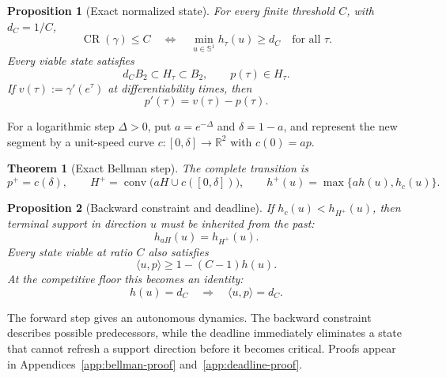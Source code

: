 \documentclass[10pt,a4paper]{article}
\newtheorem{theorem}{Theorem}[section]
\newtheorem{proposition}[proposition]{Proposition}
\theoremstyle{definition}
\theoremstyle{remark}
\DeclareMathOperator{\conv}{conv}
\DeclareMathOperator{\CR}{CR}
\newcommand{\R}{\mathbb{R}}
\newcommand{\Sph}{\mathbb{S}}
\newcommand{\ip}[2]{\langle #1,#2\rangle}
\begin{document}
\begin{proposition}[Exact normalized state]
\label{prop:normalized-state}
For every finite threshold $C$, with $d_C=1/C$,
\begin{equation}
\CR(\gamma)\le C
\quad\Longleftrightarrow\quad
\min_{u\in\Sph^1}h_\tau(u)\ge d_C
\quad\text{for all }\tau.
\label{eq:viability-state}
\end{equation}
Every viable state satisfies
\begin{equation}
d_CB_2\subset H_\tau\subset B_2,
\qquad
p(\tau)\in H_\tau.
\label{eq:state-inclusions}
\end{equation}
If $v(\tau):=\gamma'(e^\tau)$ at differentiability times, then
\begin{equation}
p'(\tau)=v(\tau)-p(\tau).
\label{eq:p-dynamics}
\end{equation}
\end{proposition}

For a logarithmic step $\Delta>0$, put $a=e^{-\Delta}$ and $\delta=1-a$, and represent the new segment by a unit-speed curve $c:[0,\delta]\to\R^2$ with $c(0)=ap$.

\begin{theorem}[Exact Bellman step]
\label{thm:bellman-step}
The complete transition is
\begin{equation}
p^+=c(\delta),
\qquad
H^+=\conv\bigl(aH\cup c([0,\delta])\bigr),
\qquad
h^+(u)=\max\{ah(u),h_c(u)\}.
\label{eq:bellman-step}
\end{equation}
\end{theorem}

\begin{proposition}[Backward constraint and deadline]
\label{prop:deadline}
If $h_c(u)<h_{H^+}(u)$, then terminal support in direction $u$ must be inherited from the past:
\begin{equation}
h_{aH}(u)=h_{H^+}(u).
\label{eq:backward-support}
\end{equation}
Every state viable at ratio $C$ also satisfies
\begin{equation}
\ip{u}{p}\ge1-(C-1)h(u).
\label{eq:deadline}
\end{equation}
At the competitive floor this becomes an identity:
\begin{equation}
h(u)=d_C
\quad\Longrightarrow\quad
\ip{u}{p}=d_C.
\label{eq:floor-contact}
\end{equation}
\end{proposition}

The forward step gives an autonomous dynamics. The backward constraint describes possible predecessors, while the deadline immediately eliminates a state that cannot refresh a support direction before it becomes critical. Proofs appear in Appendices~\ref{app:bellman-proof} and~\ref{app:deadline-proof}.
\end{document}
